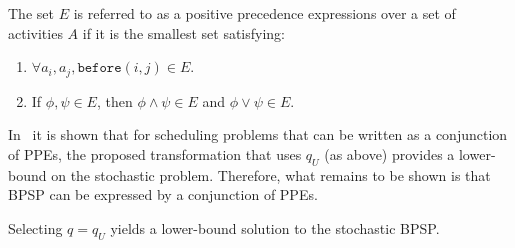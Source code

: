 \begin{definition}
\label{def:ppe} 
The set $E$ is referred to as a positive precedence expressions over a set of activities $A$ if it is the smallest set satisfying:
\begin{enumerate}
    \item $ \forall a_i, a_j, \texttt{before}(i, j) \in E$.
    \item If $\phi, \psi \in E$, then $\phi \wedge \psi \in E$ and $\phi \vee \psi \in E$.
\end{enumerate}
\end{definition} In~\cite{beck2007proactive} it is 
shown that for scheduling problems that 
can be written as a conjunction of PPEs,
the proposed transformation that uses $q_U$ (as above) provides a lower-bound
on the stochastic problem. Therefore,
what remains to be shown is that BPSP can be expressed 
by a conjunction of PPEs.
\begin{proposition}
Selecting $q= q_U$ yields a lower-bound solution to the stochastic BPSP. \label{prop:lower}
\end{proposition}
